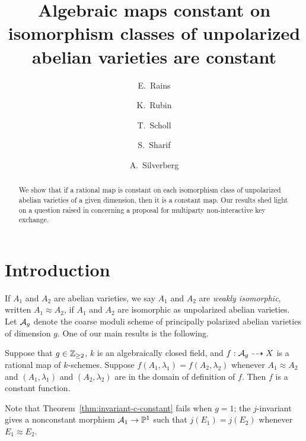 \documentclass{amsart}
\title[Algebraic maps constant on unpolarized isomorphism classes]{Algebraic maps constant on isomorphism classes of unpolarized abelian varieties are constant}
\author[E.\ Rains]{E.\ Rains}
\author[K.\ Rubin]{K.\ Rubin}
\author[T.\ Scholl]{T.\ Scholl}
\author[S.\ Sharif]{S.\ Sharif}
\author[A.\ Silverberg]{A.\ Silverberg}
\begin{document}
\begin{abstract}
We show that if a %
rational map is constant on each isomorphism class of unpolarized abelian varieties of a given dimension, then it is a constant map.
Our results shed light on a question raised in \cite{multiparty} concerning a proposal for multiparty non-interactive key exchange.
\end{abstract}


\maketitle



\section{Introduction}
\label{sec:introduction}

If $A_1$ and $A_2$ are abelian varieties, we say $A_1$ and $A_2$ are \emph{weakly isomorphic}, written $A_1 \approx A_2$, if $A_1$ and $A_2$ are isomorphic as unpolarized abelian varieties. Let $\mathcal{A}_g$ denote the coarse moduli scheme of principally polarized abelian varieties of dimension $g$. One of our main results is the following.
\begin{theorem}\label{thm:invariant-c-constant}
  Suppose that $g\in\mathbb{Z}_{\ge 2}$, $k$ is an algebraically closed field, and $f: \mathcal{A}_g \dashrightarrow X$ is a rational map of $k$-schemes. Suppose $f(A_1,\lambda_1) = f(A_2,\lambda_2)$ whenever $A_1 \approx A_2$ and $(A_1,\lambda_1)$ and $(A_2,\lambda_2)$ are in the domain of definition of $f$. Then $f$ is a constant function.
\end{theorem}
Note that Theorem~\ref{thm:invariant-c-constant} fails when $g = 1$; the $j$-invariant gives a nonconstant morphism $\mathcal{A}_1 \to \mathbb{P}^1$ such that $j(E_1) = j(E_2)$ whenever $E_1 \approx E_2$.



\end{document}
